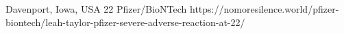           {Davenport, Iowa, USA}
          {22}
          {Pfizer/BioNTech}
          {}
          {
          }
          {https://nomoresilence.world/pfizer-biontech/leah-taylor-pfizer-severe-adverse-reaction-at-22/}

